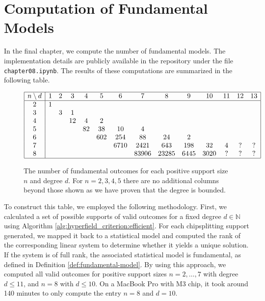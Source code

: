 \chapter{Computation of Fundamental Models}

In the final chapter, we compute the number of fundamental models. The implementation details are publicly available in the repository \cite{ducrepo} under the file \texttt{chapter08.ipynb}. The results of these computations are summarized in the following table.

\begin{figure}[H]
    \centering
    \[
    \begin{array}{|c|ccccccccccccc|}
    \hline
    n \setminus d & 1 & 2 & 3 & 4 & 5 & 6 & 7 & 8 & 9 & 10 & 11 & 12 & 13\\
    \hline
    2 & 1 &   &   &   &   &    &    &    &    &     &  & &   \\
    3 &   & 3 & 1 &   &   &    &    &    &    &     &   & &  \\
    4 &   &   & 12 & 4 & 2 &    &    &    &    &     &  & &   \\
    5 &   &   &    & 82 & 38 & 10 & 4  &    &    &     &  &&  \\
    6 &   &   &    &    & 602 & 254 & 88 & 24 & 2  &     &  &&   \\
    7 &   &   &    &    &     & 6710 & 2421 & 643 & 198 & 32  & 4 &? & ? \\
    8 &   &   &    &    &     &  & 83906 & 23285 & 6445 & 3020  & ? &?& ?\\
    \hline
    \end{array}
    \]
    \caption{The number of fundamental outcomes for each positive support size \( n \) and degree \( d \). For \( n = 2, 3, 4, 5 \) there are no additional columns beyond those shown as we have proven that the degree is bounded.}
    \label{table:computed-fundamental-models}
    \end{figure}


To construct this table, we employed the following methodology. First, we calculated a set of possible supports of valid outcomes for a fixed degree \( d\in \mathbb{N} \) using Algorithm \ref{alg:hyperfield_criterion:efficient}. For each chipsplitting support generated, we mapped it back to a statistical model and computed the rank of the corresponding linear system to determine whether it yields a unique solution. If the system is of full rank, the associated statistical model is fundamental, as defined in Definition \ref{def:fundamental-model}. By using this approach, we computed all valid outcomes for positive support sizes \( n = 2, \dots, 7 \) with degree \( d \leq 11 \), and \( n = 8 \) with \( d \leq 10 \). On a MacBook Pro with M3 chip, it took around 140 minutes to only compute the entry \( n = 8 \) and \( d = 10 \).